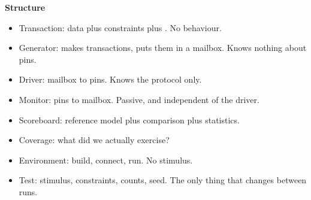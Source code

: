 \textbf{Structure}

\begin{itemize}
\item Transaction: data plus constraints plus . No
  behaviour.
\item Generator: makes transactions, puts them in a mailbox. Knows nothing
  about pins.
\item Driver: mailbox to pins. Knows the protocol only.
\item Monitor: pins to mailbox. Passive, and independent of the driver.
\item Scoreboard: reference model plus comparison plus statistics.
\item Coverage: what did we actually exercise?
\item Environment: build, connect, run. No stimulus.
\item Test: stimulus, constraints, counts, seed. The only thing that changes
  between runs.
\end{itemize}

